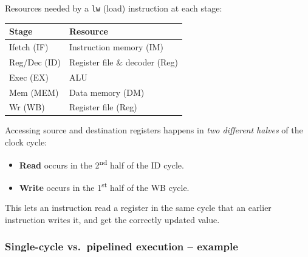 \begin{center}\begin{minipage}{\linewidth}\centering
{}
\end{minipage}
\end{center}

Resources needed by a \texttt{lw} (load) instruction at each stage:

\begin{center}
\begin{tabular}{@{}ll@{}}
\toprule
Stage & Resource \\
\midrule
Ifetch (IF)  & Instruction memory (IM) \\
Reg/Dec (ID) & Register file \& decoder (Reg) \\
Exec (EX)    & ALU \\
Mem (MEM)    & Data memory (DM) \\
Wr (WB)      & Register file (Reg) \\
\bottomrule
\end{tabular}
\end{center}

\begin{note}
Accessing source and destination registers happens in \emph{two different
halves} of the clock cycle:
\begin{itemize}
  \item \textbf{Read} occurs in the 2\textsuperscript{nd} half of the ID
  cycle.
  \item \textbf{Write} occurs in the 1\textsuperscript{st} half of the WB
  cycle.
\end{itemize}
This lets an instruction read a register in the same cycle that an earlier
instruction writes it, and get the correctly updated value.
\end{note}

\subsubsection{Single-cycle vs.\ pipelined execution -- example}

